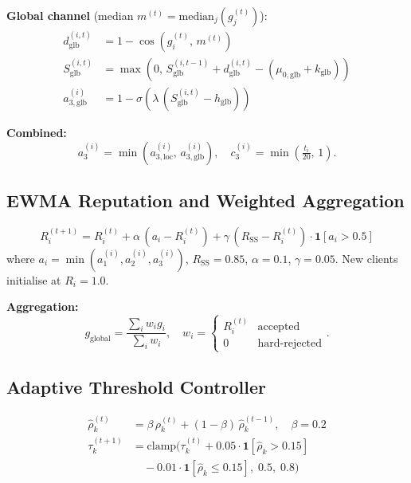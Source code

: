 \documentclass[journal]{IEEEtran}
\begin{document}
\textbf{Global channel} (median $m^{(t)} = \mathrm{median}_j(g_j^{(t)})$):
\begin{align}
  d_{\mathrm{glb}}^{(i,t)} &= 1 - \cos(g_i^{(t)},\, m^{(t)}) \\
  S_{\mathrm{glb}}^{(i,t)} &= \max\!\left(0,\, S_{\mathrm{glb}}^{(i,t-1)}
                              + d_{\mathrm{glb}}^{(i,t)} - (\mu_{0,\mathrm{glb}} + k_{\mathrm{glb}})\right) \\
  a_{3,\mathrm{glb}}^{(i)} &= 1 - \sigma\!\left(\lambda\,(S_{\mathrm{glb}}^{(i,t)} - h_{\mathrm{glb}})\right)
\end{align}

\textbf{Combined:}
\begin{equation}
  a_3^{(i)} = \min(a_{3,\mathrm{loc}}^{(i)},\, a_{3,\mathrm{glb}}^{(i)}), \quad
  c_3^{(i)} = \min\!\left(\tfrac{t_i}{20},\, 1\right).
\end{equation}

\subsection{EWMA Reputation and Weighted Aggregation}
\begin{equation}
  R_i^{(t+1)} = R_i^{(t)} + \alpha\,(a_i - R_i^{(t)}) +
    \gamma\,(R_{\mathrm{SS}} - R_i^{(t)}) \cdot \mathbf{1}[a_i > 0.5]
\end{equation}
where $a_i = \min(a_1^{(i)}, a_2^{(i)}, a_3^{(i)})$, $R_{\mathrm{SS}}{=}0.85$,
$\alpha{=}0.1$, $\gamma{=}0.05$. New clients initialise at $R_i = 1.0$.

\textbf{Aggregation:}
\begin{equation}
  g_{\mathrm{global}} = \frac{\sum_i w_i g_i}{\sum_i w_i}, \quad
  w_i = \begin{cases} R_i^{(t)} & \text{accepted} \\ 0 & \text{hard-rejected} \end{cases}.
\end{equation}

\subsection{Adaptive Threshold Controller}
\begin{align}
  \hat{\rho}_k^{(t)} &= \beta\,\rho_k^{(t)} + (1-\beta)\,\hat{\rho}_k^{(t-1)}, \quad \beta=0.2 \\
  \tau_k^{(t+1)} &= \mathrm{clamp}\!\big(\tau_k^{(t)}
    + 0.05 \cdot \mathbf{1}[\hat{\rho}_k > 0.15] \nonumber \\
    &\quad - 0.01 \cdot \mathbf{1}[\hat{\rho}_k \leq 0.15],\; 0.5,\; 0.8\big)
\end{align}
\end{document}

